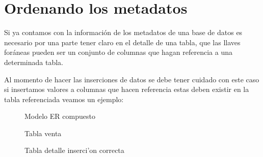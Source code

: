 \section{Ordenando los metadatos}
Si ya contamos con la informaci\'on de los metadatos de una base de datos es necesario por una parte tener claro en el detalle de una tabla, que las llaves for\'aneas pueden ser un conjunto de columnas que hagan referencia a una determinada tabla.

Al momento de hacer las inserciones de datos se debe tener cuidado con este caso si insertamos valores a columnas que hacen referencia estas deben existir en la tabla referenciada veamos un ejemplo:
\begin{figure}[H]
\centering
{}
\caption{Modelo ER compuesto} \label{fig:ModeloERcomp}
\end{figure}
\begin{figure}[H]
\centering
{}
\caption{Tabla venta} \label{fig:tabla venta}
\end{figure}
\begin{figure}[H]
\centering
{}
\caption{Tabla detalle inserci'on correcta} \label{fig:InsercionCorrecta}
\end{figure}

